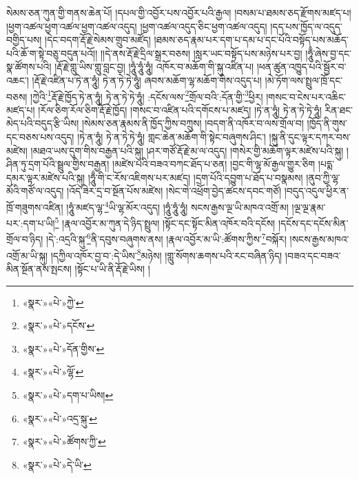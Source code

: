 སེམས་ཅན་ཀུན་གྱི་གནས་ཆེན་པོ། །དཔལ་གྱི་འབྱོར་པས་འབྱོར་པའི་རྒྱལ། །བསམ་པ་ཐམས་ཅད་རྫོགས་མཛད་པ། །ཕྱག་འཚལ་ཕྱག་འཚལ་ཕྱག་འཚལ་འདུད། །ཕྱག་འཚལ་འདུད་ཅིང་ཕྱག་འཚལ་འདུད། །དད་པས་ཁྱོད་ལ་འདུད་བགྱིད་པས། །དེང་བདག་རྡོ་རྗེ་སེམས་གྲུབ་མཛོད། །ཐམས་ཅད་རྣམ་པར་དག་པ་དམ་པ་དང་པོའི་བསྟོད་པས་མཆོད་པའི་ཆོ་ག་སྟེ་བཅུ་བདུན་པའོ།། །།དེ་ནས་རྡོ་རྗེ་དྲིལ་སྒྲར་བཅས། །སླར་ཡང་བསྟོད་པས་མཉེས་པར་བྱ། །ཧཱུྃ་ཞེས་བྱ་དང་སྣ་ཚོགས་པའི། །རྡོ་རྗེ་གླུ་ཡིས་གླུ་བླང་བྱ། །ཧཱུཾ་ཧཱུཾ་ཧཱུཾ། འཁོར་བ་མཆོག་གི་སྐུ་འཛིན་པ། །ཕན་ཚུན་འཁྱུད་པའི་སྦྱོར་བ་འཆང་། །རྡོ་རྗེ་འཛིན་པ་ཏེ་ན་ཧཱུཾ། ཏེ་ན་ཏེ་ཏེ་ཧཱུཾ། ཞབས་མཆོག་ལྷ་མཆོག་གིས་འདུད་པ། །མེ་ཏོག་ལས་སྤྲུལ་ཁྲོ་དང་བཅས། །ཀྱེའི་\footnote{«སྣར་»«པེ་»ཀྱེ་}རྡོ་རྗེ་ཁྱོད་ཏེ་ན་ཧཱུཾ། ཏེ་ན་ཏེ་ཏེ་ཧཱུཾ། :དངོས་ལས་\footnote{«སྣར་»«པེ་»དངོས་}གྲོལ་བའི་:དོན་གྱི་\footnote{«སྣར་»«པེ་»དོན་གྱིས་}ཕྱིར། །གསང་བ་ངེས་པར་འཆིང་མཛད་པ། །རོལ་ཅིག་རོལ་ཅིག་རྡོ་རྗེ་ཁྱོད། །གསང་བ་འཛིན་པའི་དགོངས་པ་མཛད། །ཏེ་ན་ཧཱུཾ། ཏེ་ན་ཏེ་ཏེ་ཧཱུཾ། རིན་ཐང་མེད་པའི་བདུད་རྩི་ཡིས། །སེམས་ཅན་རྣམས་ནི་ཁྱོད་ཀྱིས་བཀྲུས། །བདག་ནི་འཁོར་བ་ལས་གྲོལ་བ། །ཁྱོད་ནི་གུས་དང་བཅས་པས་འདུད། །ཏེ་ན་ཧཱུཾ། ཏེ་ན་ཏེ་ཏེ་ཧཱུཾ། གླང་ཆེན་མཆོག་གི་སྟེང་བཞུགས་ཤིང་། །སྐུ་ནི་དུང་ལྟར་དཀར་བས་མཛེས། །མཐའ་ཡས་དུག་གིས་བརྒྱན་པའི་སྐུ། །ཤར་གཙོ་རྡོ་རྗེ་མ་ལ་འདུད། །གསེར་གྱི་མཆོག་ལྟར་མཛེས་པའི་སྐུ། །ཤིན་ཏུ་དྲག་པོའི་སྦྲུལ་གྱིས་བརྒྱན། །མཛེས་པའི་བཟའ་བཀང་ཐོད་པ་ཅན། །བྱང་གི་ལྷ་མོ་རྒྱལ་གྱུར་ཅིག །པདྨ་དམར་ལྟར་མཛེས་པའི་སྐུ། །ཧཱུྃ་གི་ང་རོས་འཇིགས་པར་མཛད། །དྲག་པོའི་དབྱུག་པ་ཐོད་པ་བསྣམས། །ནུབ་ཀྱི་ལྷ་མོའི་གཙོ་ལ་འདུད། །འོད་ཟེར་དྲ་བ་སྔོན་པོས་མཛེས། །སེང་གེ་འཕྲོག་བྱེད་ཚངས་དབང་གཙོ། །བདུད་འདུལ་ཕྱིར་ན་ཁྲོ་གཟུགས་འཛིན། །ཧཱུཾ་མཛད་ལྷ་\footnote{«སྣར་»«པེ་»ལྷོ་}ཡི་ལྷ་མོར་འདུད། །ཧཱུཾ་ཧཱུཾ་ཧཱུཾ། སངས་རྒྱས་ལྔ་ཡི་མཁའ་འགྲོ་མ། །ལྔ་ལྔ་རྣམ་པར་:དག་པ་ཡི།\footnote{«སྣར་»«པེ་»དག་པ་ཡིས།} །རྣལ་འབྱོར་མ་ཀུན་དེ་ཉིད་སྤྲུལ། །སྟོང་དང་སྟོང་མིན་འཁོར་བའི་དངོས། །དངོས་དང་དངོས་མིན་གྲོལ་བ་ཉིད། །དེ་:འདྲའི་སྐུ་\footnote{«སྣར་»«པེ་»འདྲ་སྐུ་}ནི་དབུས་བཞུགས་ནས། །རྣལ་འབྱོར་མ་ཡི་:ཚོགས་ཀྱིས་\footnote{«སྣར་»«པེ་»ཚོགས་ཀྱི་}བསྐོར། །སངས་རྒྱས་མཁའ་འགྲོ་མ་ཡི་སྐུ། །དཀྱིལ་འཁོར་བྱ་བ་:དེ་ཡིས་\footnote{«སྣར་»«པེ་»དེ་ཡི་}མཉེས། །གླུ་སོགས་ཆགས་པའི་རང་བཞིན་ཉིད། །བཟའ་དང་བཟའ་མིན་སྔོན་ནས་སྤངས། །སྟོང་པ་ཡི་ནི་རྡོ་རྗེ་ཡིས། །

